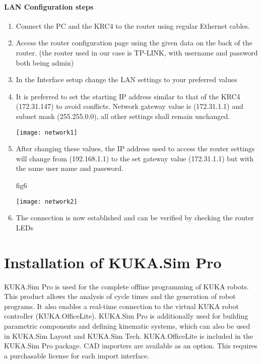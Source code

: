 			\paragraph{LAN Configuration steps}
			\begin{enumerate}
				\item Connect the PC and the KRC4 to the router using regular Ethernet cables.
				\item Access the router configuration page using the given data on the back of the router. (the router used in our case is TP-LINK, with username and password both being admin)
				\item In the Interface setup change the LAN settings to your preferred values
				\item It is preferred to set the starting IP address similar to that of the KRC4 (172.31.147) to avoid conflicts. Network gateway value is (172.31.1.1) and subnet mask (255.255.0.0), all other settings shall remain unchanged.
				
				\begin{center}
					\texttt{[image: network1]}
				\end{center}
				
		
				
				\item After changing these values, the IP address used to access the router settings will change from (192.168.1.1) to the set gateway value (172.31.1.1) but with the same user name and password.
				
				fig6
				
				\begin{center}
				\texttt{[image: network2]}
				\end{center}
				
				\item The connection is now established and can be verified by checking the router LEDs
			\end{enumerate}
		
	\newpage
	\section{Installation of KUKA.Sim Pro}
	KUKA.Sim Pro is used for the complete offline programming of KUKA robots. This product allows the analysis of cycle times and the generation of robot programs. It also enables a real-time connection to the virtual KUKA robot controller (KUKA.OfficeLite). KUKA.Sim Pro is additionally used for building parametric components and defining kinematic systems, which can also be used in KUKA.Sim Layout and KUKA.Sim Tech. KUKA.OfficeLite is included in the KUKA.Sim Pro package. CAD importers are available as an option. This requires a purchasable license for each import interface. 
	


